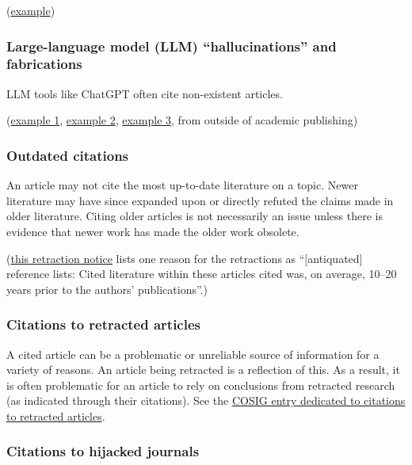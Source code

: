 \documentclass[letterpaper, 12pt]{article}
\begin{document}
(\href{https://pubpeer.com/publications/CF328DB7A6131B99F9805B49643D81\#2}{example})

\subsubsection*{Large-language model (LLM) ``hallucinations'' and fabrications}

LLM tools like ChatGPT often cite non-existent articles.

(\href{https://pubpeer.com/publications/8D6BF963665181144EC553BE2FDA92\#2}{example 1}, \href{https://pubpeer.com/publications/7F01171F32B0421DF37EE8D1B49C04#4}{example 2},
\href{https://web.archive.org/web/20230623093222/https://www.theguardian.com/technology/2023/jun/23/two-us-lawyers-fined-submitting-fake-court-citations-chatgpt}{example 3}, from outside of academic publishing)

\subsubsection*{Outdated citations}

An article may not cite the most up-to-date literature on a topic. Newer literature may have since expanded upon or directly refuted the claims made in older literature. Citing older articles is not necessarily an issue unless there is evidence that newer work has made the older work obsolete.

(\href{https://doi.org/10.1177/00315125241311636}{this retraction notice} lists one reason for the retractions as ``[antiquated] reference lists: Cited literature within these articles cited was, on average, 10–20 years prior to the authors’ publications''.)

\subsubsection*{Citations to retracted articles}

A cited article can be a problematic or unreliable source of information for a variety of reasons. An article being retracted is a reflection of this. As a result, it is often problematic for an article to rely on conclusions from retracted research (as indicated through their citations). See the \href{https://osf.io/9q3as}{COSIG entry dedicated to citations to retracted articles}.

\subsubsection*{Citations to hijacked journals}
\end{document}
